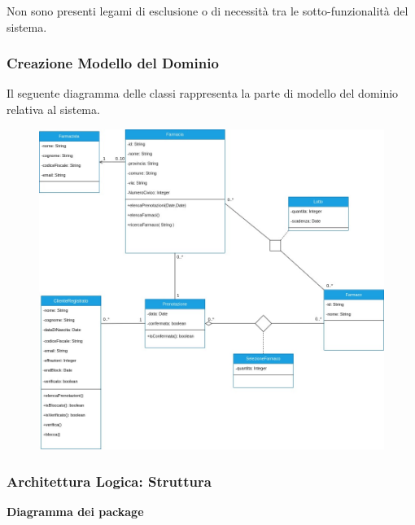 Non sono presenti legami di esclusione o di necessità tra le sotto-funzionalità del sistema. 
\hfill \break

\newpage
\subsubsection{Creazione Modello del Dominio}

Il seguente diagramma delle classi rappresenta la parte di modello del dominio relativa al sistema. \\

\begin{figure}[h!]
    \begin{center}
        \includegraphics[width=\textwidth]{immagini/ModelloDominio.jpg}
    \end{center}
\end{figure}
\hfill \break

\newpage
\subsubsection{Architettura Logica: Struttura}
\hfill \break

\textbf{Diagramma dei package}
\hfill \break

